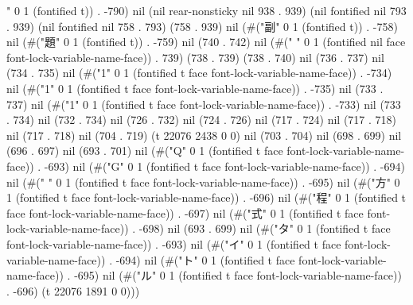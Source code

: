 " 0 1 (fontified t)) . -790) nil (nil rear-nonsticky nil 938 . 939) (nil fontified nil 793 . 939) (nil fontified nil 758 . 793) (758 . 939) nil (#("副" 0 1 (fontified t)) . -758) nil (#("題" 0 1 (fontified t)) . -759) nil (740 . 742) nil (#(" " 0 1 (fontified nil face font-lock-variable-name-face)) . 739) (738 . 739) (738 . 740) nil (736 . 737) nil (734 . 735) nil (#("1" 0 1 (fontified t face font-lock-variable-name-face)) . -734) nil (#("1" 0 1 (fontified t face font-lock-variable-name-face)) . -735) nil (733 . 737) nil (#("1" 0 1 (fontified t face font-lock-variable-name-face)) . -733) nil (733 . 734) nil (732 . 734) nil (726 . 732) nil (724 . 726) nil (717 . 724) nil (717 . 718) nil (717 . 718) nil (704 . 719) (t 22076 2438 0 0) nil (703 . 704) nil (698 . 699) nil (696 . 697) nil (693 . 701) nil (#("Q" 0 1 (fontified t face font-lock-variable-name-face)) . -693) nil (#("G" 0 1 (fontified t face font-lock-variable-name-face)) . -694) nil (#(" " 0 1 (fontified t face font-lock-variable-name-face)) . -695) nil (#("方" 0 1 (fontified t face font-lock-variable-name-face)) . -696) nil (#("程" 0 1 (fontified t face font-lock-variable-name-face)) . -697) nil (#("式" 0 1 (fontified t face font-lock-variable-name-face)) . -698) nil (693 . 699) nil (#("タ" 0 1 (fontified t face font-lock-variable-name-face)) . -693) nil (#("イ" 0 1 (fontified t face font-lock-variable-name-face)) . -694) nil (#("ト" 0 1 (fontified t face font-lock-variable-name-face)) . -695) nil (#("ル" 0 1 (fontified t face font-lock-variable-name-face)) . -696) (t 22076 1891 0 0)))
